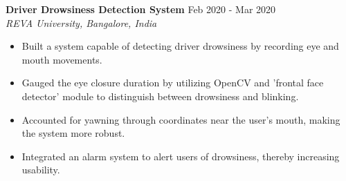 \documentclass[a4paper,9pt]{extarticle}
\begin{document}
\noindent
\textbf{Driver Drowsiness Detection System}  \hfill Feb 2020 - Mar 2020\\ %
\textit{REVA University, Bangalore, India} %
\begin{itemize}
    \item Built a system capable of detecting driver drowsiness by recording eye and mouth movements.
    \item  Gauged the eye closure duration by utilizing OpenCV and 'frontal face detector' module to distinguish between drowsiness and blinking. 
    \item Accounted for yawning through coordinates near the user's mouth, making the system more robust.
    \item  Integrated an alarm system to alert users of drowsiness, thereby increasing usability. %
\end{itemize}

\end{document}
